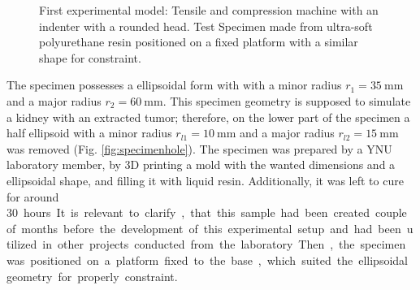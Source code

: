 \begin{figure}%
    \centering
   \qquad
   \caption{First experimental model: Tensile and compression machine with an indenter with a rounded head. Test Specimen made from ultra-soft polyurethane resin positioned on a fixed platform with a similar shape for constraint.}%
   \label{fig:firstexperiment}%
\end{figure}

The specimen possesses a ellipsoidal form with 
with a minor radius $r_1 = \SI{35}{\milli \m}$ and a major radius $r_2 = \SI{60}{\milli \m}$. 
This specimen geometry is supposed to simulate a kidney with an extracted tumor; therefore,
on the lower part of the specimen a half ellipsoid with a minor radius $r_{l1} = \SI{10}{\milli \m}$ 
and a major radius $r_{l2} = \SI{15}{\milli \m}$ was removed (Fig. \ref{fig:specimenhole}). 
The specimen was prepared by a YNU laboratory member, by 3D printing a mold with the wanted dimensions
 and a ellipsoidal shape, and filling it with liquid resin. 
 Additionally, it was left to cure for around \SI{30} hours. It is relevant to clarify, that this 
 sample had been created couple of months before the development of this experimental setup and 
 had been utilized in other projects conducted from the laboratory.
Then, the specimen was positioned on a platform fixed to the base, which suited 
the ellipsoidal geometry for properly constraint. 

